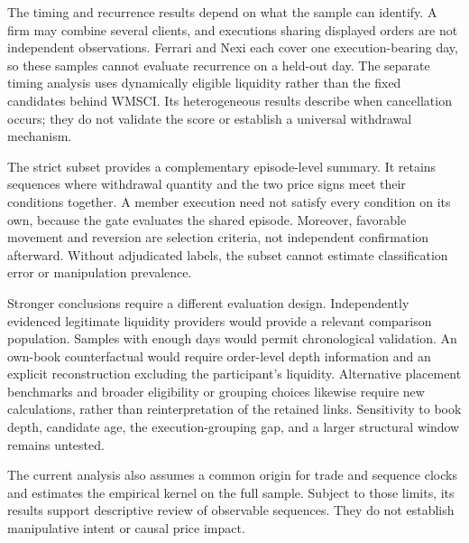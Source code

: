 \documentclass[11pt]{article}
\begin{document}
The timing and recurrence results depend on what the sample can identify. A firm may combine several clients, and executions sharing displayed orders are not independent observations. Ferrari and Nexi each cover one execution-bearing day, so these samples cannot evaluate recurrence on a held-out day. The separate timing analysis uses dynamically eligible liquidity rather than the fixed candidates behind WMSCI. Its heterogeneous results describe when cancellation occurs; they do not validate the score or establish a universal withdrawal mechanism.

The strict subset provides a complementary episode-level summary. It retains sequences where withdrawal quantity and the two price signs meet their conditions together. A member execution need not satisfy every condition on its own, because the gate evaluates the shared episode. Moreover, favorable movement and reversion are selection criteria, not independent confirmation afterward. Without adjudicated labels, the subset cannot estimate classification error or manipulation prevalence.

Stronger conclusions require a different evaluation design. Independently evidenced legitimate liquidity providers would provide a relevant comparison population. Samples with enough days would permit chronological validation. An own-book counterfactual would require order-level depth information and an explicit reconstruction excluding the participant's liquidity. Alternative placement benchmarks and broader eligibility or grouping choices likewise require new calculations, rather than reinterpretation of the retained links. Sensitivity to book depth, candidate age, the execution-grouping gap, and a larger structural window remains untested.

The current analysis also assumes a common origin for trade and sequence clocks and estimates the empirical kernel on the full sample. Subject to those limits, its results support descriptive review of observable sequences. They do not establish manipulative intent or causal price impact.

\end{document}
